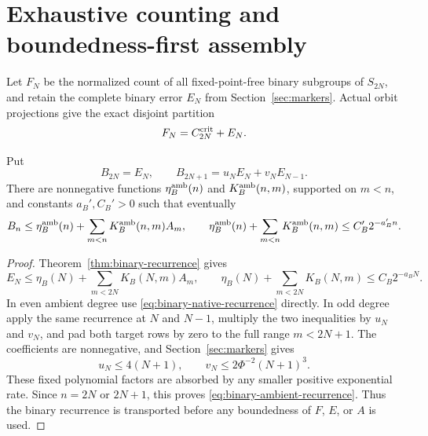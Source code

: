 \section{Exhaustive counting and boundedness-first assembly}
\label{sec:assembly}
Let $F_N$ be the normalized count of all fixed-point-free binary
subgroups of $S_{2N}$, and retain the complete binary error $E_N$
from Section~\ref{sec:markers}. Actual orbit projections give the
exact disjoint partition
\begin{equation}\label{eq:binary-partition}
 F_N=C_{2N}^{\mathrm{crit}}+E_N.
\end{equation}

\begin{proposition}
\label{prop:binary-frontier-transport}
Put
\[
 B_{2N}=E_N,\qquad B_{2N+1}=u_NE_N+v_NE_{N-1}.
\]
There are nonnegative functions $\eta_B^{\rm amb}(n)$ and
$K_B^{\rm amb}(n,m)$, supported on $m<n$, and constants
$a_B',C_B'>0$ such that eventually
\begin{equation}\label{eq:binary-ambient-recurrence}
 B_n\leq\eta_B^{\rm amb}(n)
       +\sum_{m<n}K_B^{\rm amb}(n,m)A_m,
 \qquad
 \eta_B^{\rm amb}(n)+\sum_{m<n}K_B^{\rm amb}(n,m)
       \leq C_B'2^{-a_B'n}.
\end{equation}
\end{proposition}
\begin{proof}
Theorem~\ref{thm:binary-recurrence} gives
\begin{equation}\label{eq:binary-native-recurrence}
 E_N\leq\eta_B(N)+\sum_{m<2N}K_B(N,m)A_m,
 \qquad\eta_B(N)+\sum_{m<2N}K_B(N,m)\leq C_B2^{-a_BN}.
\end{equation}
In even ambient degree use \eqref{eq:binary-native-recurrence} directly.
In odd degree apply the same recurrence
at $N$ and $N-1$, multiply the two inequalities by $u_N$ and $v_N$,
and pad both target rows by zero to the full range $m<2N+1$.  The coefficients are
nonnegative, and Section~\ref{sec:markers} gives
\[
 u_N\leq4(N+1),\qquad v_N\leq2\Phi^{-2}(N+1)^3.
\]
These fixed polynomial factors are absorbed by any smaller positive
exponential rate. Since $n=2N$ or $2N+1$, this proves
\eqref{eq:binary-ambient-recurrence}.  Thus the binary recurrence is
transported before any boundedness of $F$, $E$, or $A$ is used.
\end{proof}


